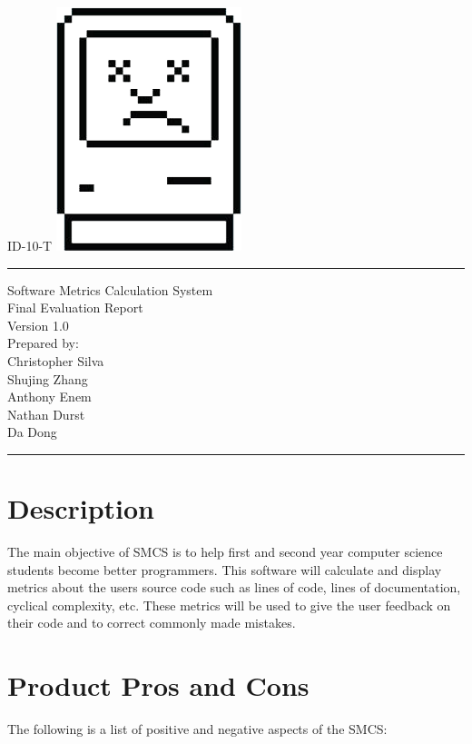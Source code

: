 \documentclass{scrreprt}
\author{Christopher Silva}
\date{}
\begin{document}
	\begin{titlepage}
		\flushright
		\LARGE{ID-10-T}
		\includegraphics[scale=0.08]{logo.png}
		\rule{16cm}{5pt}\vskip1cm
		\centering
		\Huge{Software Metrics Calculation System}\\
		\vspace{2cm}
		\Huge{Final Evaluation Report}\\
		\vspace{2cm}
		\LARGE{Version 1.0\\}
		\vspace{2cm}
		Prepared by:\\
	    Christopher Silva\\
	    Shujing Zhang\\
		Anthony Enem\\
		Nathan Durst\\
		Da Dong\\
		\vfill
		\rule{16cm}{5pt}
	\end{titlepage}
	\tableofcontents
	{\let\clearpage\relax\pagebreak \chapter{Description}}
	
	
	The main objective of SMCS is to help first and second year computer science students become better programmers. This software will calculate and display metrics about the users source code such as lines of code, lines of documentation, cyclical complexity, etc. These metrics will be used to give the user feedback on their code and to correct commonly made mistakes.\\
	
	{\let\clearpage\relax \chapter{Product Pros and Cons}}
	The following is a list of positive and negative aspects of the SMCS:\\
	
\end{document}
